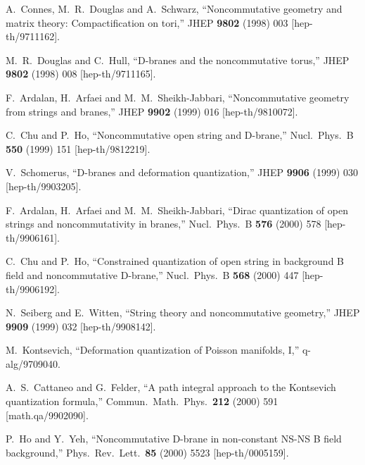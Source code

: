 \documentclass[a4paper,12pt]{article}
\begin{document}
\newpage


A.~Connes, M.~R.~Douglas and A.~Schwarz,
``Noncommutative geometry and matrix theory: Compactification on tori,''
JHEP {\bf 9802} (1998) 003
[hep-th/9711162].

M.~R.~Douglas and C.~Hull,
``D-branes and the noncommutative torus,''
JHEP {\bf 9802} (1998) 008
[hep-th/9711165].

F.~Ardalan, H.~Arfaei and M.~M.~Sheikh-Jabbari,
``Noncommutative geometry from strings and branes,''
JHEP {\bf 9902} (1999) 016
[hep-th/9810072].

C.~Chu and P.~Ho,
``Noncommutative open string and D-brane,''
Nucl.\ Phys.\ B {\bf 550} (1999) 151
[hep-th/9812219].

V.~Schomerus,
``D-branes and deformation quantization,''
JHEP {\bf 9906} (1999) 030
[hep-th/9903205].

F.~Ardalan, H.~Arfaei and M.~M.~Sheikh-Jabbari,
``Dirac quantization of open strings and noncommutativity in branes,''
Nucl.\ Phys.\ B {\bf 576} (2000) 578
[hep-th/9906161].

C.~Chu and P.~Ho,
``Constrained quantization of open string in background B field and  
noncommutative D-brane,''
Nucl.\ Phys.\ B {\bf 568} (2000) 447
[hep-th/9906192].

N.~Seiberg and E.~Witten,
``String theory and noncommutative geometry,''
JHEP {\bf 9909} (1999) 032
[hep-th/9908142].

M.~Kontsevich,
``Deformation quantization of Poisson manifolds, I,''
q-alg/9709040.

A.~S.~Cattaneo and G.~Felder,
``A path integral approach to the Kontsevich quantization formula,''
Commun.\ Math.\ Phys.\  {\bf 212} (2000) 591
[math.qa/9902090].

P.~Ho and Y.~Yeh,
``Noncommutative D-brane in non-constant NS-NS B field background,''
Phys.\ Rev.\ Lett.\  {\bf 85} (2000) 5523
[hep-th/0005159].
\end{document}
